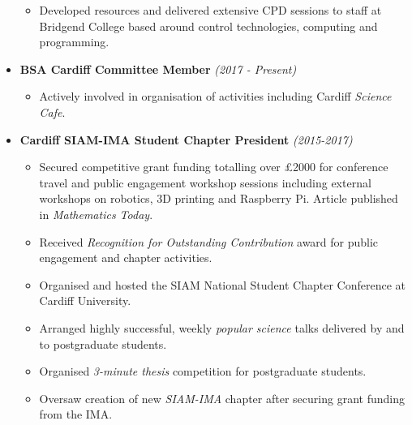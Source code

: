 \documentclass[10pt,a4paper,sans]{moderncv}        %
\begin{document}
\begin{itemize}
{			\vspace{4pt}
			
			\small{
				\begin{itemize}	
					\item Developed resources and delivered extensive CPD sessions to staff at Bridgend College based around control technologies, computing and programming.
				\end{itemize}
		} }
		
		\vspace{4pt}
		
		\item{\textbf{BSA Cardiff Committee Member} \textit{(2017 - Present)}
			
			\vspace{4pt}
			
			\small{
				\begin{itemize}	
					\item Actively involved in organisation of activities including Cardiff \textit{Science Cafe}.
				\end{itemize}
		}}
		
		\vspace{4pt}
		
		\item{\textbf{Cardiff SIAM-IMA Student Chapter President} \textit{(2015-2017)}
			
			\vspace{4pt}
			
			\small{
				\begin{itemize}	
					\item Secured competitive grant funding totalling over £2000 for conference travel and public engagement workshop sessions including external workshops on robotics, 3D printing and Raspberry Pi. Article published in \textit{Mathematics Today}.
					\vspace{3pt}
					\item Received \textit{Recognition for Outstanding Contribution} award for public engagement and chapter activities.
					\vspace{3pt}
					\item Organised and hosted the SIAM National Student Chapter Conference at Cardiff University.
					\vspace{3pt}
					\item Arranged highly successful, weekly \textit{popular science} talks delivered by and to postgraduate students.
					\vspace{3pt}
					\item Organised \textit{3-minute thesis} competition for postgraduate students.	
					\vspace{3pt}
					\item Oversaw creation of new \textit{SIAM-IMA} chapter after securing grant funding from the IMA.
				\end{itemize}
		}}
		
	\end{itemize}
	
\end{document}
